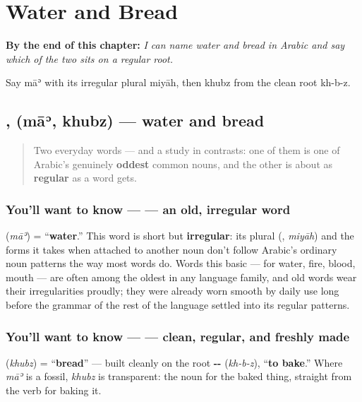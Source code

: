 
\chapter{Water and Bread}
\label{ch:ar-water-and-bread}

\begin{chapteropening}
\textbf{By the end of this chapter:} \emph{I can name water and bread in Arabic and say which of the two sits on a regular root.}

Say māʾ with its irregular plural miyāh, then khubz from the clean root kh-b-z.
\end{chapteropening}

\section[\texorpdfstring{\ar{ماء} \ar{خبز} (māʾ khubz)}{ماء خبز (māʾ khubz)}]{,  (māʾ, khubz) — water and bread}

\label{lesson:AR-C13-maa-khubz}



\begin{quote}
Two everyday words — and a study in contrasts: one of them is one of Arabic's genuinely \textbf{oddest} common nouns, and the other is about as \textbf{regular} as a word gets.
\end{quote}

\subsection*{You'll want to know —  — an old, irregular word}
\textbf{} (\emph{māʾ}) = \textquotedblleft{}\textbf{water}.\textquotedblright{} This word is short but \textbf{irregular}: its plural (\textbf{}, \emph{miyāh}) and the forms it takes when attached to another noun don't follow Arabic's ordinary noun patterns the way most words do. Words this basic — for water, fire, blood, mouth — are often among the oldest in any language family, and old words wear their irregularities proudly; they were already worn smooth by daily use long before the grammar of the rest of the language settled into its regular patterns.

\subsection*{You'll want to know —  — clean, regular, and freshly made}
\textbf{} (\emph{khubz}) = \textquotedblleft{}\textbf{bread}\textquotedblright{} — built cleanly on the root \textbf{--} (\emph{kh-b-z}), \textquotedblleft{}\textbf{to bake}.\textquotedblright{} Where \emph{māʾ} is a fossil, \emph{khubz} is transparent: the noun for the baked thing, straight from the verb for baking it.

